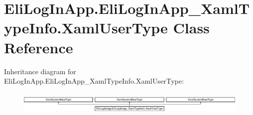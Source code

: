 \hypertarget{class_eli_log_in_app_1_1_eli_log_in_app___xaml_type_info_1_1_xaml_user_type}{}\section{Eli\+Log\+In\+App.\+Eli\+Log\+In\+App\+\_\+\+Xaml\+Type\+Info.\+Xaml\+User\+Type Class Reference}
\label{class_eli_log_in_app_1_1_eli_log_in_app___xaml_type_info_1_1_xaml_user_type}
Inheritance diagram for Eli\+Log\+In\+App.\+Eli\+Log\+In\+App\+\_\+\+Xaml\+Type\+Info.\+Xaml\+User\+Type\+:\begin{figure}[H]
\begin{center}
\leavevmode
\includegraphics[height=1.131313cm]{d9/d4d/class_eli_log_in_app_1_1_eli_log_in_app___xaml_type_info_1_1_xaml_user_type}
\end{center}
\end{figure}
